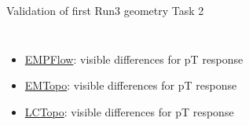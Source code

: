 \begin{frame}{Validation of first Run3 geometry Task 2}
\begin{columns}
\begin{column}{0.5\textwidth}
\begin{figure}
            \end{figure}
        \end{column}
    \end{columns}
        \begin{itemize}
        \item \href{https://atlas-computing.web.cern.ch/atlas-computing/links/PhysValDir/JetEtMiss/jet_21-10-21_task2b/AntiKt4EMPFlowJets/index.html}{EMPFlow}: visible differences for pT response
        \item \href{https://atlas-computing.web.cern.ch/atlas-computing/links/PhysValDir/JetEtMiss/jet_21-10-21_task2b/AntiKt4EMTopoJets/index.html}{EMTopo}: visible differences for pT response
        \item \href{https://atlas-computing.web.cern.ch/atlas-computing/links/PhysValDir/JetEtMiss/jet_21-10-21_task2b/AntiKt4LCTopoJets/index.html}{LCTopo}: visible differences for pT response
    \end{itemize}
\end{frame}